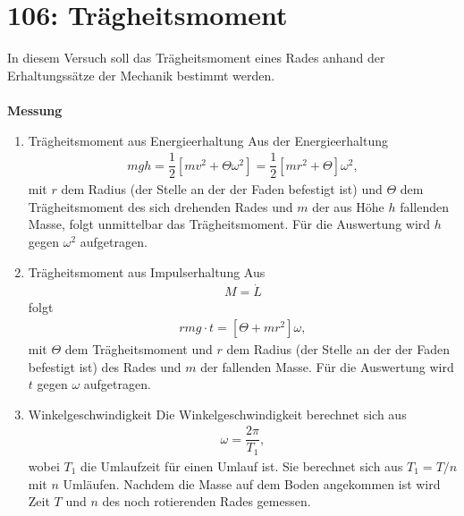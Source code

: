 \newpage
\section{106: Trägheitsmoment}
In diesem Versuch soll das Trägheitsmoment eines Rades anhand der Erhaltungssätze der Mechanik bestimmt werden.\\\\
\textbf{Messung} 
\begin{enumerate}[label=--]
        \item Trägheitsmoment aus Energieerhaltung \hspace{25pt} 
                Aus der Energieerhaltung
                \begin{align} 
                        mgh=\dfrac{1}{2}\left[mv^2+\Theta \omega ^2\right]=\dfrac{1}{2}\left[mr^2+\Theta \right]\omega ^2
                ,\end{align} 
                mit $r$ dem Radius (der Stelle an der der Faden befestigt ist) und $\Theta $ dem Trägheitsmoment des sich drehenden Rades und $m$ der aus Höhe $h$ fallenden Masse, folgt unmittelbar das Trägheitsmoment.
                Für die Auswertung wird $h$ gegen $\omega ^2$ aufgetragen.
        \item Trägheitsmoment aus Impulserhaltung \hspace{25pt} 
                Aus
                \begin{align} 
                        M=\dot{L}
                \end{align} 
                folgt
                \begin{align} 
                        rmg\cdot t = \left[\Theta +mr^2\right]\omega 
                ,\end{align} 
                mit $\Theta $ dem Trägheitsmoment und $r$ dem Radius (der Stelle an der der Faden befestigt ist) des Rades und $m$ der fallenden Masse.
                Für die Auswertung wird $t$ gegen $\omega $ aufgetragen.
        \item Winkelgeschwindigkeit \hspace{25pt} 
                Die Winkelgeschwindigkeit berechnet sich aus
                \begin{align} 
                        \omega =\dfrac{2\pi }{T_1}
                ,\end{align} 
                wobei $T_1$ die Umlaufzeit für einen Umlauf ist. 
                Sie berechnet sich aus $T_1=T/n$ mit $n$ Umläufen. 
                Nachdem die Masse auf dem Boden angekommen ist wird Zeit $T$ und $n$ des noch rotierenden Rades gemessen.
\end{enumerate}

